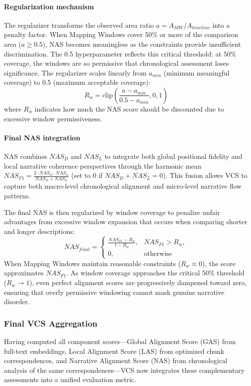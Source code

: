 \documentclass[main.tex]{subfiles}
\begin{document}
\paragraph{Regularization mechanism}
The regularizer transforms the observed area ratio $a = A_{MW}/A_{timeline}$ into a penalty factor. When Mapping Windows cover 50\% or more of the comparison area ($a \geq 0.5$), NAS becomes meaningless as the constraints provide insufficient discrimination. The 0.5 hyperparameter reflects this critical threshold: at 50\% coverage, the windows are so permissive that chronological assessment loses significance. The regularizer scales linearly from $a_{min}$ (minimum meaningful coverage) to 0.5 (maximum acceptable coverage):
\begin{equation}
R_w = \text{clip}\left(\frac{a - a_{min}}{0.5 - a_{min}}, 0, 1\right)
\end{equation}
where $R_w$ indicates how much the NAS score should be discounted due to excessive window permissiveness.

\paragraph{Final NAS integration}
NAS combines $NAS_D$ and $NAS_L$ to integrate both global positional fidelity and local narrative coherence perspectives through the harmonic mean $NAS_{F1} = \frac{2 \cdot NAS_D \cdot NAS_L}{NAS_D + NAS_L}$ (set to 0 if $NAS_D + NAS_L = 0$). This fusion allows VCS to capture both macro-level chronological alignment and micro-level narrative flow patterns.

The final NAS is then regularized by window coverage to penalize unfair advantages from excessive window expansion that occurs when comparing shorter and longer descriptions:
\begin{equation}
\boxed{NAS_{final} = \begin{cases}
\frac{NAS_{F1} - R_w}{1 - R_w}, & NAS_{F1} > R_w, \\
0, & \text{otherwise}
\end{cases}}
\end{equation}
When Mapping Windows maintain reasonable constraints ($R_w \approx 0$), the score approximates $NAS_{F1}$. As window coverage approaches the critical 50\% threshold ($R_w \to 1$), even perfect alignment scores are progressively dampened toward zero, ensuring that overly permissive windowing cannot mask genuine narrative disorder.


\subsubsection{Final VCS Aggregation}
Having computed all component scores—Global Alignment Score (GAS) from full-text embeddings, Local Alignment Score (LAS) from optimized chunk correspondences, and Narrative Alignment Score (NAS) from chronological analysis of the same correspondences—VCS now integrates these complementary assessments into a unified evaluation metric.
\end{document}
